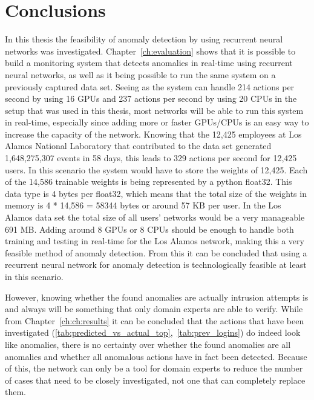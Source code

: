 \chapter{Conclusions}\label{ch:conclusions}

In this thesis the feasibility of anomaly detection by using recurrent neural networks was investigated. Chapter~\ref{ch:evaluation} shows that it is possible to build a monitoring system that detects anomalies in real-time using recurrent neural networks, as well as it being possible to run the same system on a previously captured data set. Seeing as the system can handle 214 actions per second by using 16 GPUs and 237 actions per second by using 20 CPUs in the setup that was used in this thesis, most networks will be able to run this system in real-time, especially since adding more or faster GPUs/CPUs is an easy way to increase the capacity of the network. Knowing that the 12,425 employees at Los Alamos National Laboratory that contributed to the data set generated 1,648,275,307 events in 58 days, this leads to 329 actions per second for 12,425 users. In this scenario the system would have to store the weights of 12,425. Each of the 14,586 trainable weights is being represented by a python float32. This data type is 4 bytes per float32, which means that the total size of the weights in memory is 4 * 14,586 = 58344 bytes or around 57 KB per user. In the Los Alamos data set the total size of all users' networks would be a very manageable 691 MB. Adding around 8 GPUs or 8 CPUs should be enough to handle both training and testing in real-time for the Los Alamos network, making this a very feasible method of anomaly detection. From this it can be concluded that using a recurrent neural network for anomaly detection is technologically feasible at least in this scenario. 

However, knowing whether the found anomalies are actually intrusion attempts is and always will be something that only domain experts are able to verify. While from Chapter~\ref{ch:ch:results} it can be concluded that the actions that have been investigated (\ref{tab:predicted_vs_actual_top},~\ref{tab:prev_logins}) do indeed look like anomalies, there is no certainty over whether the found anomalies are all anomalies and whether all anomalous actions have in fact been detected. Because of this, the network can only be a tool for domain experts to reduce the number of cases that need to be closely investigated, not one that can completely replace them. 

